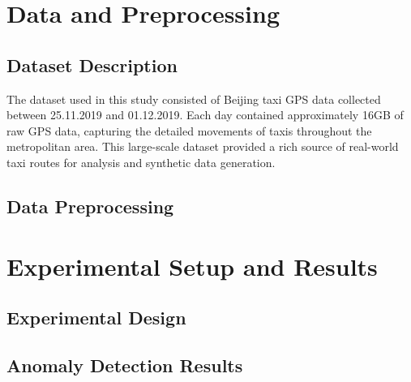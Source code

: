 \documentclass[runningheads]{llncs}
\begin{document}
\section{Data and Preprocessing}
\label{sec:data-preprocessing}

\subsection{Dataset Description}
\label{sec:data}

The dataset used in this study consisted of Beijing taxi GPS data collected between 25.11.2019 and 01.12.2019. Each day contained approximately 16GB of raw GPS data, capturing the detailed movements of taxis throughout the metropolitan area. This large-scale dataset provided a rich source of real-world taxi routes for analysis and synthetic data generation.

\subsection{Data Preprocessing}
\label{sec:preprocessing}

\begin{compactoutline}
\end{compactoutline}

\section{Experimental Setup and Results}
\label{sec:evaluation}

\subsection{Experimental Design}
\label{sec:exp-design}

\begin{compactoutline}
\end{compactoutline}

\subsection{Anomaly Detection Results}
\label{sec:results}
\end{document}
